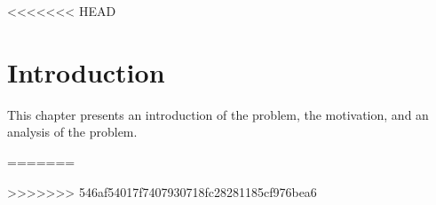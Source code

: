 <<<<<<< HEAD
\chapter{Introduction}
This chapter presents an introduction of the problem, the motivation, and an analysis of the problem.




=======

>>>>>>> 546af54017f7407930718fc28281185cf976bea6

